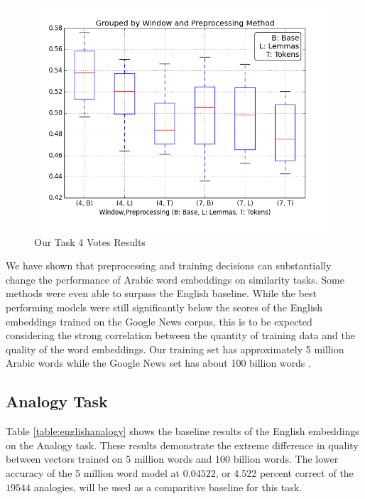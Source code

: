 \begin{figure}
  \includegraphics[width=\linewidth]{results_spearman/ar_similiarity_task_4_votes_results_spearplot.png}
  \caption{Our Task 4 Votes Results}
  \label{fig:spearplot4}
\end{figure}


We have shown that preprocessing and training decisions can substantially change the performance of Arabic word embeddings on similarity tasks. Some methods were even able to surpass the English baseline. While the best performing models were still significantly below the scores of the English embeddings trained on the Google News corpus, this is to be expected considering the strong correlation between the quantity of training data and the quality of the word embeddings. Our training set has approximately 5 million Arabic words while the Google News set has about 100 billion words \cite{mikolovdist:2013}.

\subsection{Analogy Task}

Table \ref{table:englishanalogy} shows the baseline results of the English embeddings on the Analogy task. These results demonstrate the extreme difference in quality between vectors trained on 5 million words and 100 billion words. The lower accuracy of the 5 million word model at $0.04522$, or 4.522 percent correct of the $19544$ analogies, will be used as a comparitive baseline for this task.


